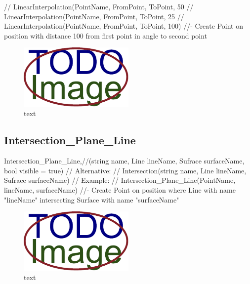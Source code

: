 		//		LinearInterpolation(PointName, FromPoint, ToPoint, 50%
		//		LinearInterpolation(PointName, FromPoint, ToPoint, 25%
		//		LinearInterpolation(PointName, FromPoint, ToPoint, 100)	//- Create Point on position with distance 100 from first point in angle to second point 

\begin{figure}[H]
	\centering
	\includegraphics[width=0.5\textwidth]{obrazky-figures/placeholder.pdf}
	\caption{text}
	\label{fig:1}
\end{figure}

\subsection{Intersection\_Plane\_Line}
		Intersection\_Plane\_Line,//(string name, Line lineName, Sufrace surfaceName, bool visible = true)
		//	Alternative:
		//	Intersection(string name, Line lineName, Sufrace surfaceName)
		//	Example:
		//		Intersection\_Plane\_Line(PointName,  lineName, surfaceName) //- Create Point on position where Line with name "lineName" intersecting Surface with name "surfaceName"
\begin{figure}[H]
	\centering
	\includegraphics[width=0.5\textwidth]{obrazky-figures/placeholder.pdf}
	\caption{text}
	\label{fig:1}
\end{figure}

